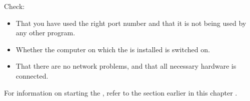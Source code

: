 % 
%
%
Check:
\begin{itemize}
\item That you have used the right port number and that it is not being used by any other program. 
\item Whether the computer on which the \gdagent{} is installed is switched on.
\item That there are no network problems, and that all necessary hardware is connected. 
\end{itemize}

For information on starting the \gdagent{}, refer to the section earlier in this chapter . 










